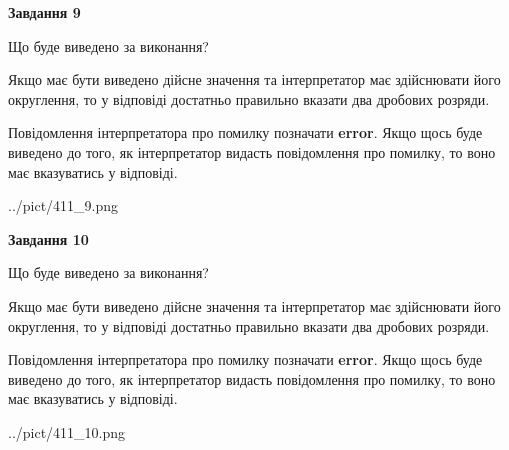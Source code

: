 \documentclass[12pt, ukrainian]{article}
\begin{document}
{\begin {Large}
{\begin {center}\textbf{Завдання 9}\end {center}}\par
Що буде виведено за виконання? \par

Якщо має бути виведено дійсне значення та інтерпретатор має здійснювати його округлення, 
то у відповіді достатньо правильно вказати два дробових розряди.

Повідомлення інтерпретатора про помилку позначати \textbf{error}.
Якщо щось буде виведено до того, як інтерпретатор видасть повідомлення про помилку, 
то воно має вказуватись у відповіді. \par

\begin{center}
	{../pict/411_9.png}
\end{center}
\newpage

{\begin {center}\textbf{Завдання 10}\end {center}}\par
Що буде виведено за виконання? \par

Якщо має бути виведено дійсне значення та інтерпретатор має здійснювати його округлення, 
то у відповіді достатньо правильно вказати два дробових розряди.

Повідомлення інтерпретатора про помилку позначати \textbf{error}.
Якщо щось буде виведено до того, як інтерпретатор видасть повідомлення про помилку, 
то воно має вказуватись у відповіді. \par

\begin{center}
	{../pict/411_10.png}
\end{center}
\newpage

\end {Large}}
\end{document}
